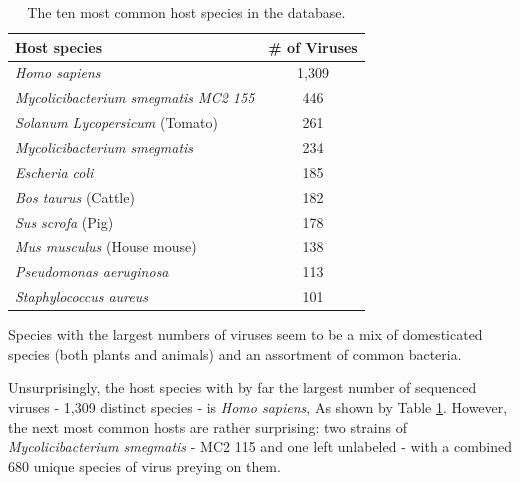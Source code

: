 \documentclass[12pt]{article}
\begin{document}
    \begin{table}[H]
        \begin{center}
            \begin{tabular}{|l||c|}
                \hline
                Host species                                 & \# of Viruses \\ \hline\hline
                \textit{Homo sapiens}                        & 1,309         \\ \hline
                \textit{Mycolicibacterium smegmatis MC2 155} & 446           \\ \hline
                \textit{Solanum Lycopersicum} (Tomato)       & 261           \\ \hline
                \textit{Mycolicibacterium smegmatis}         & 234           \\ \hline
                \textit{Escheria coli}                       & 185           \\ \hline
                \textit{Bos taurus} (Cattle)                 & 182           \\ \hline
                \textit{Sus scrofa} (Pig)                    & 178           \\ \hline
                \textit{Mus musculus} (House mouse)          & 138           \\ \hline
                \textit{Pseudomonas aeruginosa}              & 113           \\ \hline
                \textit{Staphylococcus aureus}               & 101           \\ \hline    
            \end{tabular}
            \caption{The ten most common host species in the database.}
            \label{most_common_hosts_table}
        \end{center}
    \end{table}

    Species with the largest numbers of viruses seem to be a mix of domesticated
    species (both plants and animals) and an assortment of common bacteria.

    Unsurprisingly, the host species with by far the largest number of
    sequenced viruses - 1,309 distinct species - is \emph{Homo sapiens}, As
    shown by Table \ref{most_common_hosts_table}. However, the next most
    common hosts are rather surprising: two strains of 
    \emph{Mycolicibacterium smegmatis} - MC2 115 and one left unlabeled - with a
    combined 680 unique species of virus preying on them.
\end{document}
